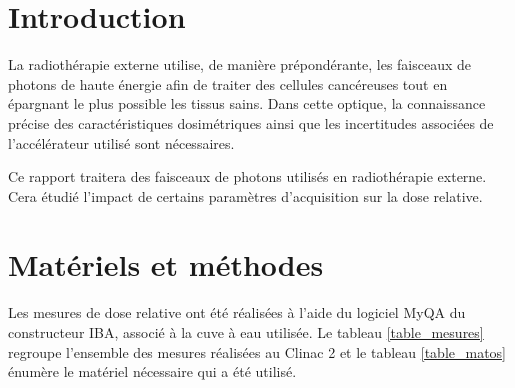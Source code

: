 \documentclass{article}
\begin{document}




\onehalfspacing

\pagestyle{fancy}
	\renewcommand\headrulewidth{0.5pt}
	\renewcommand\footrulewidth{0.5pt}
	\fancyfoot[R]{\thepage}

\tableofcontents
\clearpage
\section{Introduction}

La radiothérapie externe utilise, de manière prépondérante, les faisceaux de photons de haute énergie afin de traiter des cellules cancéreuses tout en épargnant le plus possible les tissus sains. Dans cette optique, la connaissance précise des caractéristiques dosimétriques ainsi que les incertitudes associées de l'accélérateur utilisé sont nécessaires. 

Ce rapport traitera des faisceaux de photons utilisés en radiothérapie externe. Cera étudié l'impact de certains paramètres d'acquisition sur la dose relative.

\section{Matériels et méthodes}

Les mesures de dose relative ont été réalisées à l'aide du logiciel MyQA du constructeur IBA, associé à la cuve à eau utilisée. Le tableau \ref*{table_mesures} regroupe l'ensemble des mesures réalisées au Clinac 2 et le tableau \ref*{table_matos} énumère le matériel nécessaire qui a été utilisé.
\end{document}
